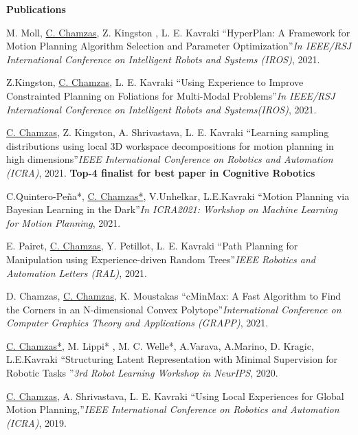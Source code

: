 \documentclass[letterpaper,11pt]{article}
\newcommand{\resheading}[1]{{\large \colorbox{mygrey}{\begin{minipage}{\textwidth}{\textbf{#1 \vphantom{p\^{E}}}}\end{minipage}}}}
\begin{document}
\resheading{Publications }
\begingroup
	\renewcommand{\section}[2]{}%
\begin{thebibliography}{9}
     M. Moll, \underline{C. Chamzas}, Z. Kingston , L. E. Kavraki
     ``HyperPlan: A Framework for Motion Planning Algorithm Selection and Parameter Optimization''\textit{In IEEE/RSJ International Conference on Intelligent Robots and Systems (IROS)}, 2021.  

     Z.Kingston, \underline{C. Chamzas}, L. E. Kavraki
     ``Using Experience to Improve Constrainted Planning on Foliations for Multi-Modal Problems''\textit{In IEEE/RSJ International Conference on Intelligent Robots and Systems(IROS)}, 2021.  

    \underline{C. Chamzas}, Z. Kingston, A. Shrivastava, L. E. Kavraki
	``Learning sampling distributions using local 3D workspace decompositions for motion planning in high dimensions''\textit{IEEE International Conference on Robotics and Automation (ICRA)}, 2021. \textbf{Top-4 finalist for best paper in Cognitive Robotics} 

     C.Quintero-Peña*, \underline{C. Chamzas*}, V.Unhelkar, L.E.Kavraki
	``Motion Planning via Bayesian Learning in the Dark''\textit{In ICRA2021: Workshop on Machine Learning for Motion Planning}, 2021.  

	E. Pairet, \underline{C. Chamzas}, Y. Petillot, L. E. Kavraki
	``Path Planning for Manipulation using Experience-driven Random Trees''\textit{IEEE Robotics and Automation Letters (RAL)}, 2021.
	
	D. Chamzas, \underline{C. Chamzas}, K. Moustakas
	``cMinMax: A Fast Algorithm to Find the Corners in an N-dimensional Convex Polytope''\textit{International Conference on Computer Graphics Theory and Applications (GRAPP)}, 2021. 

	\underline{C. Chamzas*}, M. Lippi* , M. C. Welle*, A.Varava, A.Marino, D. Kragic, L.E.Kavraki
    ``Structuring Latent Representation with Minimal Supervision for Robotic Tasks ''\textit{3rd Robot Learning Workshop in NeurIPS}, 2020. 

	\underline{C. Chamzas}, A. Shrivastava, L. E. Kavraki
	``Using Local Experiences for Global Motion Planning,''\textit{IEEE International Conference on Robotics and Automation (ICRA)}, 2019.
   
	\end{thebibliography}
	\endgroup
\end{document}
